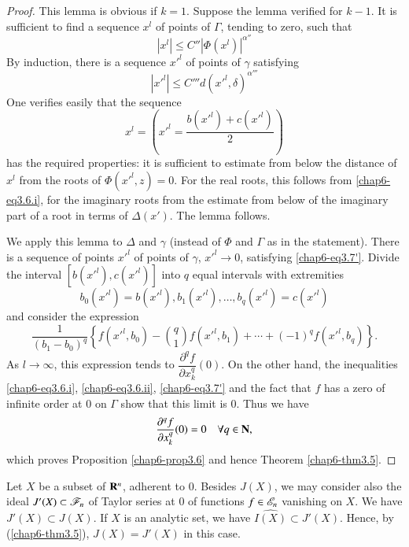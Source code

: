 \begin{proof}
This lemma is obvious if $k=1$. Suppose the lemma verified for $k-1$. It is sufficient to find a sequence $x^{l}$ of points of $\Gamma$, tending to zero, such that
$$
|x^{l}|\leq C''|\Phi (x^{l})|^{\alpha''}
$$
By induction, there is a sequence ${x'}^{l}$ of points of $\gamma$ satisfying 
\begin{equation*}
|{x'}^{l}|\leq C''' d({x'}^{l},\delta)^{\alpha'''}\tag{3.7$'$}\label{chap6-eq3.7'}
\end{equation*}
One verifies easily that the sequence
$$
x^{l}=\left({x'}^{l}=\dfrac{b({x'}^{l})+c({x'}^{l})}{2}\right)
$$\pageoriginale
has the required properties: it is sufficient to estimate from below the distance of $x^{l}$ from the roots of $\Phi({x'}^{l},z)=0$. For the real roots, this follows from \eqref{chap6-eq3.6.i}, for the imaginary roots from the estimate from below of the imaginary part of a root in terms of $\Delta(x')$. The lemma follows.

We apply this lemma to $\Delta$ and $\gamma$ (instead of $\Phi$ and $\Gamma$ as in the statement). There is a sequence of points ${x'}^{l}$ of points of $\gamma$, ${x'}^{l}\to 0$, satisfying \eqref{chap6-eq3.7'}. Divide the interval $[b({x'}^{l}), c({x'}^{l})]$ into $q$ equal intervals with extremities
$$
b_{0}({x'}^{l})=b({x'}^{l}), b_{1}({x'}^{l}),\ldots,b_{q}({x'}^{l})=c({x'}^{l})
$$
and consider the expression
$$
\dfrac{1}{(b_{1}-b_{0})^{q}}\left\{f({x'}^{l},b_{0})-\binom{q}{1}f({x'}^{l},b_{1})+\cdots+(-1)^{q}f({x'}^{l},b_{q})\right\}.
$$
As $l\to \infty$, this expression tends to $\dfrac{\partial^{q}f}{\partial x^{q}_{k}}(0)$. On the other hand, the inequalities \eqref{chap6-eq3.6.i}, \eqref{chap6-eq3.6.ii}, \eqref{chap6-eq3.7'} and the fact that $f$ has a zero of infinite order at $0$ on $\Gamma$ show that this limit is $0$. Thus we have
$$
\dfrac{\partial^{q}f}{\partial x^{q}_{k}}(0)=0\quad \forall q\in\mathbf{N},
$$
which proves Proposition \ref{chap6-prop3.6} and hence Theorem \ref{chap6-thm3.5}.
\end{proof}

\begin{remark}\label{chap6-rem3.8}
Let $X$ be a subset of $\mathbf{R}^{n}$, adherent to $0$. Besides $J(X)$, we may consider also the ideal $J'(X)\subset \mathscr{F}_{n}$ of Taylor series at $0$ of functions $f\in\mathscr{E}_{n}$ vanishing on $X$. We have $J'(X)\subset J(X)$. If $X$ is an analytic set, we have $\widehat{I(X)}\subset J'(X)$. Hence, by (\ref{chap6-thm3.5}), $J(X)=J'(X)$ in this case.
\end{remark}

